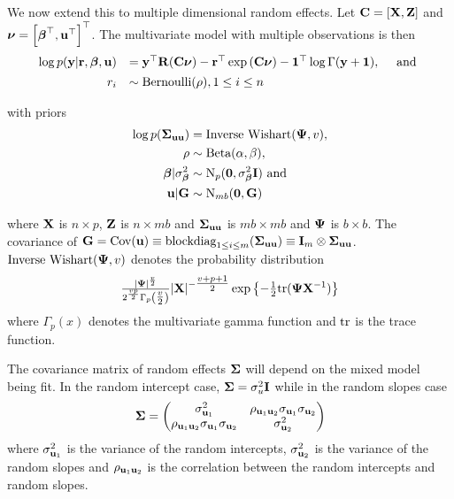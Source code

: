 \noindent We now extend this to multiple dimensional random effects. Let ${\bf C} =
[{\bf X}, {\bf Z}]$ and ${\boldsymbol \nu} = \left[ {\boldsymbol \beta}^\top, {\bf u}^\top \right]^\top$. The
multivariate model with multiple observations is then $$
    \begin{array}{rl} \log{p({\bf y}|{\bf r}, {\boldsymbol\beta}, {\bf u})} & = {\bf y}^\top {\bf R} ({\bf C}{\boldsymbol \nu})
        - {\bf r}^\top \exp{({\bf C}{\boldsymbol\nu})} - {\bf 1}^\top \log{\Gamma{({\bf y}+ {\bf1})}},
        \quad \mbox{ and } \\ [1ex] r_i                           & \sim
        \text{Bernoulli}(\rho), 1 \leq i \leq n
        \\ \end{array} $$

\noindent with priors
\begin{align*}
	\log{p({\boldsymbol\Sigma}_{{\bf u}{\bf u}})} & = \text{Inverse Wishart}({\boldsymbol \Psi}, v),    \\
	\rho                       & \sim \text{Beta}(\alpha, \beta),             \\
	{\boldsymbol \beta}|\sigma^2_{\boldsymbol \beta}     & \sim \text{N}_p({\bf 0}, \sigma^2_{\boldsymbol \beta} {\bf I}) \text{ and } \\
	{\bf u}|{\bf G}       & \sim \text{N}_{mb}({\bf 0}, {\bf G})              
\end{align*}

\noindent where ${\bf X}$ is $n \times p$, ${\bf Z}$ is $n \times mb$ and ${\boldsymbol \Sigma}_{{\bf u}
{\bf u}}$ is $mb \times mb$ and ${\boldsymbol \Psi}$ is $b \times b$. The covariance of ${\bf G} =
\mbox{Cov}({\bf u}) \equiv \text{blockdiag}_{1 \leq i \leq m} ({\boldsymbol \Sigma}_{{\bf u} {\bf u}}) \equiv {\bf I}_m
\otimes {\boldsymbol\Sigma}_{{\bf u} {\bf u}}$. $\text{Inverse Wishart}({\boldsymbol \Psi}, v)$ denotes the
probability distribution
\begin{equation*}
\tfrac{|{\boldsymbol \Psi}|^\frac{v}{2}}{2^{\frac{vp}{2}}
\Gamma_p{\left(\tfrac{v}{2}\right)}} |{\bf X}|^{-\tfrac{v + p + 1}{2}}
\exp{\left\{-\tfrac{1}{2} \text{tr}{({\boldsymbol\Psi}{\bf X}^{-1})}\right\}}
\end{equation*}
where $\Gamma_p{(x)}$ denotes the multivariate gamma function and $\text{tr}$ is the
trace function.

The covariance matrix of random effects ${\boldsymbol \Sigma}$ will depend on the mixed
model being fit. In the random intercept case, ${\boldsymbol \Sigma} = \sigma_u^2 {\bf I}$ while
in the random slopes case
\[
	{\boldsymbol \Sigma} = 
	\begin{pmatrix}
		\sigma_{{\bf u}_1}^2                                 & \rho_{{\bf u}_1 {\bf u}_2} \sigma_{{\bf u}_1} \sigma_{{\bf u}_2} \\
		\rho_{{\bf u}_1 {\bf u}_2} \sigma_{{\bf u}_1} \sigma_{{\bf u}_2} & \sigma_{{\bf u}_2}^2                                 
	\end{pmatrix}
\]
where $\sigma_{{\bf u}_1}^2$ is the variance of the random intercepts,
$\sigma_{{\bf u}_2}^2$ is the variance of the random slopes and $\rho_{{\bf u}_1
{\bf u}_2}$ is the correlation between the random intercepts and random slopes.

